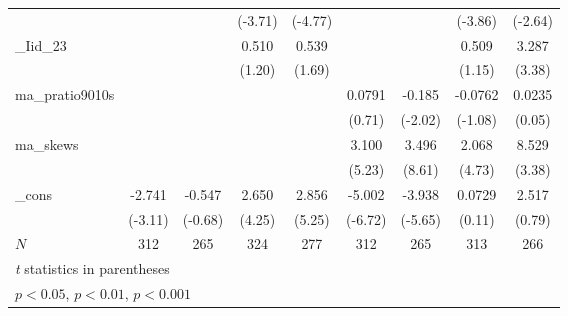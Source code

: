 {\begin{tabular}{l*{8}{c}}
            &                     &                     &     (-3.71)         &     (-4.77)         &                     &                     &     (-3.86)         &     (-2.64)         \\
[1em]
\_Iid\_23     &                     &                     &       0.510         &       0.539         &                     &                     &       0.509         &       3.287\sym{***}\\
            &                     &                     &      (1.20)         &      (1.69)         &                     &                     &      (1.15)         &      (3.38)         \\
[1em]
ma\_pratio9010s&                     &                     &                     &                     &      0.0791         &      -0.185\sym{*}  &     -0.0762         &      0.0235         \\
            &                     &                     &                     &                     &      (0.71)         &     (-2.02)         &     (-1.08)         &      (0.05)         \\
[1em]
ma\_skews    &                     &                     &                     &                     &       3.100\sym{***}&       3.496\sym{***}&       2.068\sym{***}&       8.529\sym{***}\\
            &                     &                     &                     &                     &      (5.23)         &      (8.61)         &      (4.73)         &      (3.38)         \\
[1em]
\_cons      &      -2.741\sym{**} &      -0.547         &       2.650\sym{***}&       2.856\sym{***}&      -5.002\sym{***}&      -3.938\sym{***}&      0.0729         &       2.517         \\
            &     (-3.11)         &     (-0.68)         &      (4.25)         &      (5.25)         &     (-6.72)         &     (-5.65)         &      (0.11)         &      (0.79)         \\
\hline
\(N\)       &         312         &         265         &         324         &         277         &         312         &         265         &         313         &         266         \\
\hline\hline
\multicolumn{9}{l}{\footnotesize \textit{t} statistics in parentheses}\\
\multicolumn{9}{l}{\footnotesize \sym{*} \(p<0.05\), \sym{**} \(p<0.01\), \sym{***} \(p<0.001\)}\\
\end{tabular}
}
